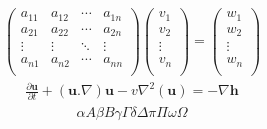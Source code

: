 \documentclass{article}
\begin{document}
\begin{align*}
    \begin{pmatrix}
a_{11}&a_{12}&\cdots&a_{1n}\\
a_{21}&a_{22}&\cdots&a_{2n}\\
\vdots&\vdots&\ddots&\vdots \\
a_{n1}&a_{n2}&\cdots&a_{nn}\\
\end{pmatrix}
\begin{pmatrix}
v_1\\
v_2\\
\vdots\\
v_n\\
\end{pmatrix}
=
\begin{pmatrix}
w_1\\
w_2\\
\vdots\\
w_n\\
\end{pmatrix}
\end{align*}
\begin{align*}
    \frac{\partial \textbf{u}}{\partial t}+(\textbf{u}.\nabla)\textbf{u}-v \nabla^2(\textbf{u})=-\nabla \textbf{h}
\end{align*}
\begin{align*}
    \alpha A \beta B \gamma \Gamma \delta \Delta \pi \Pi \omega \Omega
\end{align*}
\end{document}
